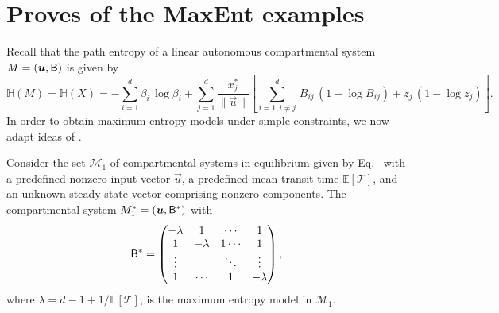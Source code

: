 \documentclass[smallextended]{svjour3}
\makeatletter
\renewcommand*{\eqref}[1]{%
  \hyperref[{#1}]{\textup{\tagform@{\ref*{#1}}}}%
}
\newcommand{\E}{\mathbb{E}}
\newcommand{\TT}{\mathcal{T}}
\renewcommand{\H}{\mathbb{H}}
\newcommand{\suml}{\sum\limits}
\newcommand{\vnorms}[1]{\|#1\|}
\makeatother
\begin{document}
\section{Proves of the MaxEnt examples}
	Recall that the path entropy of a linear autonomous compartmental system $M=(\vec{u},\tens{B})$ is given by
	\begin{equation*}
		\H(M) = \H(X) = -\suml_{i=1}^d\beta_i\,\log\beta_i + \suml_{j=1}^d \frac{x^\ast_j}{\vnorms{\vec{u}}}\left[\suml_{i=1,i\neq j}^d \,B_{ij}\,(1-\log B_{ij}) + z_j\,(1-\log z_j)\right].
	\end{equation*}
	In order to obtain maximum entropy models under simple constraints, we now adapt ideas of \cite{Girardin2004MCAP}.

	\begin{proposition}
    \label{proposition:max_ent_example_1}
		Consider the set $\mathcal{M}_1$ of compartmental systems in equilibrium given by Eq.~\eqref{eqn:lin_CS_sys}  with a predefined nonzero input vector $\vec{u}$, a predefined mean transit time $\E\left[\TT\right]$, and an unknown steady-state vector comprising nonzero components.
		The compartmental system $M^\ast_1=(\vec{u},\tens{B}^\ast)$ with 
		\begin{equation*}
			\mathsf{B}^\ast = \begin{pmatrix}
									-\lambda & 1 & \cdots & 1\\
									1 & -\lambda & 1 \cdots & 1 \\
									\vdots & & \ddots & \vdots\\
									1 & \cdots & 1 & -\lambda
             \end{pmatrix},
		\end{equation*}
		where $\lambda=d-1+1/\E\left[\TT\right]$, 		
		is the maximum entropy model in $\mathcal{M}_1$.
	\end{proposition}
\end{document}
